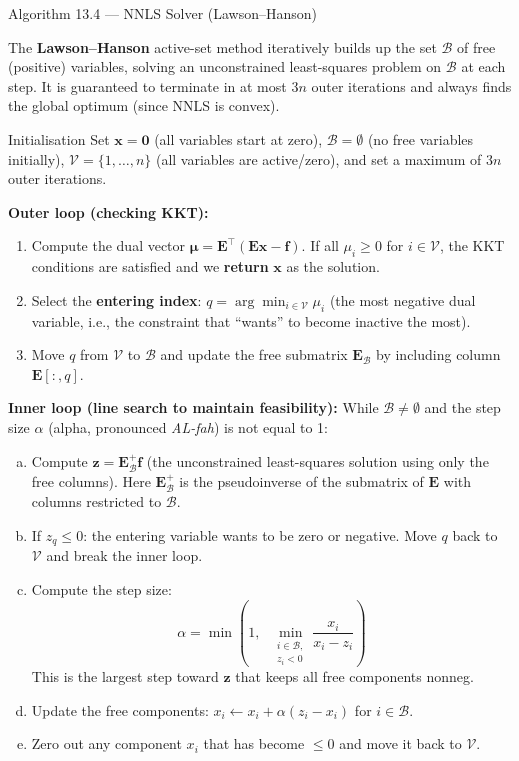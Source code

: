 \documentclass[aspectratio=169,10pt]{beamer}
\newcommand{\bx}{\mathbf{x}}
\newcommand{\bE}{\mathbf{E}}
\newcommand{\bmu}{\boldsymbol{\mu}}
\begin{document}
\begin{frame}[allowframebreaks]{Algorithm 13.4 --- NNLS Solver (Lawson--Hanson)}

  The \textbf{Lawson--Hanson} active-set method iteratively builds up the set
  $\mathcal{B}$ of free (positive) variables, solving an unconstrained least-squares
  problem on $\mathcal{B}$ at each step.  It is guaranteed to terminate in at most
  $3n$ outer iterations and always finds the global optimum (since NNLS is convex).

  \begin{block}{Initialisation}
    Set $\bx = \mathbf{0}$ (all variables start at zero), $\mathcal{B} = \emptyset$
    (no free variables initially), $\mathcal{V} = \{1,\ldots,n\}$ (all variables
    are active/zero), and set a maximum of $3n$ outer iterations.
  \end{block}

  \textbf{Outer loop (checking KKT):}
  \begin{enumerate}
    \item Compute the dual vector $\bmu = \bE^{\top}(\bE\bx - \mathbf{f})$.
          If all $\mu_i \geq 0$ for $i \in \mathcal{V}$, the KKT conditions are satisfied
          and we \textbf{return} $\bx$ as the solution.
    \item Select the \textbf{entering index}: $q = \arg\min_{i\in\mathcal{V}} \mu_i$
          (the most negative dual variable, i.e., the constraint that ``wants'' to
          become inactive the most).
    \item Move $q$ from $\mathcal{V}$ to $\mathcal{B}$ and update the free submatrix
          $\bE_{\mathcal{B}}$ by including column $\bE[:,q]$.
  \end{enumerate}

  \textbf{Inner loop (line search to maintain feasibility):}
  While $\mathcal{B} \neq \emptyset$ and the step size $\alpha$ (alpha, pronounced
  \emph{AL-fah}) is not equal to 1:
  \begin{enumerate}[(a)]
    \item Compute $\mathbf{z} = \bE_{\mathcal{B}}^+\mathbf{f}$
          (the unconstrained least-squares solution using only the free columns).
          Here $\bE_{\mathcal{B}}^+$ is the pseudoinverse of the submatrix of $\bE$
          with columns restricted to $\mathcal{B}$.
    \item If $z_q \leq 0$: the entering variable wants to be zero or negative.
          Move $q$ back to $\mathcal{V}$ and break the inner loop.
    \item Compute the step size:
          \[
            \alpha = \min\!\left(1,\;\;
              \min_{\substack{i \in \mathcal{B},\\ z_i < 0}}
              \frac{x_i}{x_i - z_i}\right)
          \]
          This is the largest step toward $\mathbf{z}$ that keeps all free components nonneg.
    \item Update the free components: $x_i \leftarrow x_i + \alpha(z_i - x_i)$ for $i \in \mathcal{B}$.
    \item Zero out any component $x_i$ that has become $\leq 0$ and move it back to $\mathcal{V}$.
  \end{enumerate}


\end{frame}
\end{document}
